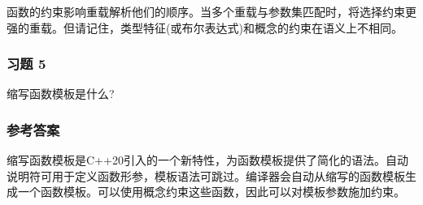 函数的约束影响重载解析他们的顺序。当多个重载与参数集匹配时，将选择约束更强的重载。但请记住，类型特征(或布尔表达式)和概念的约束在语义上不相同。

\subsubsection{习题 5}

缩写函数模板是什么?

\subsubsection{参考答案}

缩写函数模板是C++20引入的一个新特性，为函数模板提供了简化的语法。自动说明符可用于定义函数形参，模板语法可跳过。编译器会自动从缩写的函数模板生成一个函数模板。可以使用概念约束这些函数，因此可以对模板参数施加约束。












